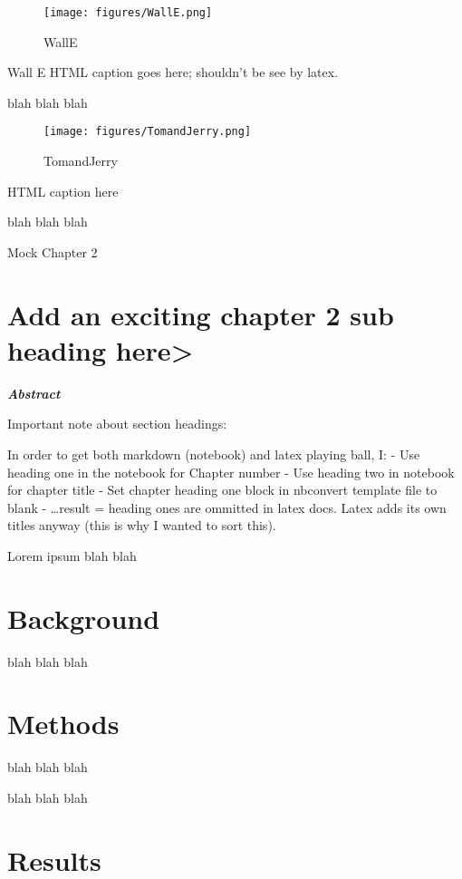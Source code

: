 \documentclass{report}
\begin{document}
    \begin{figure}[htbp]
\centering
\texttt{[image: figures/WallE.png]}
\caption{WallE\label{fig:WallE}}
\end{figure}

Wall E HTML caption goes here; shouldn't be see by latex.

    blah blah blah

    \begin{figure}[htbp]
\centering
\texttt{[image: figures/TomandJerry.png]}
\caption{TomandJerry\label{fig:TomandJerry}}
\end{figure}

HTML caption here

    blah blah blah




    {Mock Chapter 2}



    \chapter{Add an exciting chapter 2 sub heading here\textgreater{}}


    \textbf{\emph{Abstract}}

    Important note about section headings:

In order to get both markdown (notebook) and latex playing ball, I: -
Use heading one in the notebook for Chapter number - Use heading two in
notebook for chapter title - Set chapter heading one block in nbconvert
template file to blank - \ldots{}result = heading ones are ommitted in
latex docs. Latex adds its own titles anyway (this is why I wanted to
sort this).

    Lorem ipsum blah blah


    \chapter{Background}


    blah blah blah


    \chapter{Methods}


    blah blah blah

    blah blah blah


    \chapter{Results}
\end{document}
